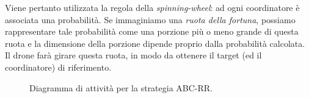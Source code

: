 Viene pertanto utilizzata la regola della \textit{spinning-wheel}: ad ogni coordinatore è associata una probabilità.
Se immaginiamo una \textit{ruota della fortuna}, possiamo rappresentare tale probabilità come una porzione più o meno grande  di questa ruota e la dimensione della porzione dipende proprio dalla probabilità calcolata.
Il drone farà girare questa ruota, in modo da ottenere il target (ed il coordinatore) di riferimento.

\begin{figure}[H] 
    \captionsetup{justification=centering, margin=2cm, font=footnotesize}
    \begin{center}
    \end{center}
    \caption{Diagramma di attività per la strategia ABC-RR.}
    \label{attivita_abc}
\end{figure}